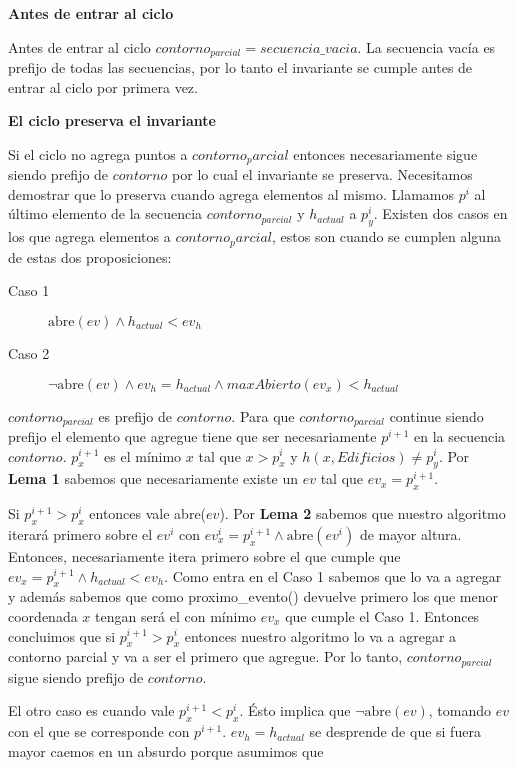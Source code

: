 \textbf{Antes de entrar al ciclo}
\par
Antes de entrar al ciclo $contorno_{parcial} = secuencia\_vacia$. La secuencia vacía es prefijo de todas las secuencias, por lo tanto
el invariante se cumple antes de entrar al ciclo por primera vez.
\par
\textbf{El ciclo preserva el invariante}
\par
Si el ciclo no agrega puntos a $contorno_parcial$ entonces necesariamente sigue siendo prefijo de $contorno$ por lo cual
el invariante se preserva. Necesitamos demostrar que lo preserva cuando agrega elementos al mismo. Llamamos $p^i$ al último 
elemento de la secuencia $contorno_{parcial}$ y $h_{actual}$ a $p^i_y$. Existen dos casos en los que agrega elementos a 
$contorno_parcial$, estos son cuando se cumplen alguna de estas dos proposiciones:
\begin{description}
	\item[Caso 1] $\text{abre}(ev) \land h_{actual} < ev_h$
	\item[Caso 2] $\neg\text{abre}(ev) \land ev_h = h_{actual} \land maxAbierto(ev_x) < h_{actual}$
\end{description}
$contorno_{parcial}$ es prefijo de $contorno$. Para que $contorno_{parcial}$ continue siendo prefijo el elemento
que agregue tiene que ser necesariamente $p^{i+1}$ en la secuencia $contorno$. $p^{i+1}_x$ es el mínimo $x$ tal que $x > p^i_x$
 y $h(x, Edificios) \neq p^i_y$. Por \textbf{Lema 1} sabemos que necesariamente existe un $ev$ tal que $ev_x = p^{i+1}_x$.
\par
Si $p^{i+1}_x > p^{i}_x$ entonces vale abre($ev$). Por \textbf{Lema 2} sabemos que nuestro algoritmo
iterará primero sobre el $ev^i$ con $ev^i_x = p^{i+1}_x \land \text{abre}(ev^i)$ de mayor altura. Entonces, necesariamente itera
primero sobre el que cumple que $ev_x = p^{i+1}_x \land h_{actual} < ev_h$. Como entra en el Caso 1 sabemos que lo va a agregar y además
sabemos que como proximo\_evento() devuelve primero los que menor coordenada $x$ tengan será el con mínimo $ev_x$ que cumple el Caso 1.
Entonces concluimos que si $p^{i+1}_x > p^{i}_x$ entonces nuestro algoritmo lo va a agregar a contorno parcial y va a ser el
primero que agregue. Por lo tanto, $contorno_{parcial}$ sigue siendo prefijo de $contorno$.
\par
El otro caso es cuando vale $p^{i+1}_x < p^{i}_x$. Ésto implica que $\neg\text{abre}(ev)$, tomando $ev$ con el que se 
corresponde con $p^{i+1}$. $ev_h = h_{actual}$ se desprende de que si fuera mayor caemos en un absurdo porque asumimos que 
